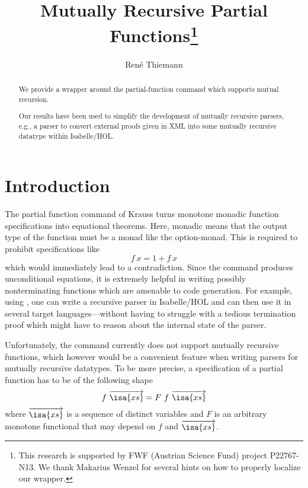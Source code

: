 \documentclass[11pt,a4paper]{article}
\newcommand\isakwd[1]{\textsf{\isa{#1}}}
\newcommand\parfun{\isakwd{partial-function}}
\newcommand\vect[1]{\overrightarrow{#1}}
\newcommand\xs{\isa{xs}}
\begin{document}
\title{Mutually Recursive Partial Functions\thanks{This research is supported by FWF (Austrian Science Fund) project P22767-N13. 
We thank Makarius Wenzel for several hints on how to properly localize our wrapper.}}
\author{Ren\'e Thiemann}
\maketitle

\begin{abstract}
  We provide a wrapper around the partial-function command which supports
  mutual recursion. 
  
  Our results have been used to simplify the development of mutually
  recursive parsers, e.g., a parser to convert external proofs given in XML 
  into some mutually recursive datatype within Isabelle/HOL.
\end{abstract}



\tableofcontents

\section{Introduction}

The partial function command of Krauss \cite{partial_function} turns monotone monadic function specifications
into equational theorems. Here, monadic means that the output type of the function must be a monad
like the option-monad. This is required to prohibit specifications like
\[
f\ x = 1 + f\ x
\]
which would immediately lead to a contradiction. Since the command produces unconditional 
equations, it is extremely helpful in writing possibly nonterminating functions which 
are amenable to code generation. For example, using \parfun, one can  write a 
recursive parser in Isabelle/HOL and can then use it in several target languages---without having to struggle
with a tedious termination proof which might have to reason about the internal 
state of the parser.

Unfortunately, the command currently does not support mutually recursive functions, which however
would be a convenient feature when writing parsers for mutually recursive datatypes.
To be more precise, a specification of a partial function has to be of the following shape
\begin{equation}
\label{nmr}
f\ \vect{\xs} = F\ f\ \vect{\xs}
\end{equation}
where $\vect{\xs}$ is a sequence of distinct variables and $F$ is an 
arbitrary monotone functional that may depend on $f$ and $\vect{\xs}$.
\end{document}

